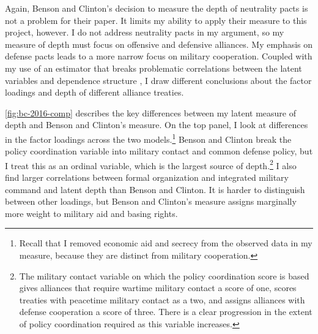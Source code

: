 \documentclass[12pt]{article}
\begin{document}
Again, Benson and Clinton's decision to measure the depth of neutrality pacts is not a problem for their paper. 
It limits my ability to apply their measure to this project, however. 
I do not address neutrality pacts in my argument, so my measure of depth must focus on offensive and defensive alliances. 
My emphasis on defense pacts leads to a more narrow focus on military cooperation.
Coupled with my use of an estimator that breaks problematic correlations between the latent variables and dependence structure \citep{Murrayetal2013}, I draw different conclusions about the factor loadings and depth of different alliance treaties. 


\autoref{fig:bc-2016-comp} describes the key differences between my latent measure of depth and Benson and Clinton's measure.
On the top panel, I look at differences in the factor loadings across the two models.\footnote{Recall that I removed economic aid and secrecy from the observed data in my measure, because they are distinct from military cooperation.} 
Benson and Clinton break the policy coordination variable into military contact and common defense policy, but I treat this as an ordinal variable, which is the largest source of depth.\footnote{The military contact variable on which the policy coordination score is based gives alliances that require wartime military contact a score of one, scores treaties with peacetime military contact as a two, and assigns alliances with defense cooperation a score of three. There is a clear progression in the extent of policy coordination required as this variable increases.}
I also find larger correlations between formal organization and integrated military command and latent depth than Benson and Clinton.
It is harder to distinguish between other loadings, but Benson and Clinton's measure assigns marginally more weight to military aid and basing rights.  
\end{document}
